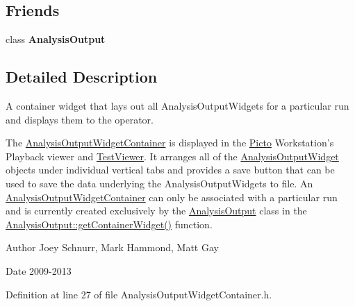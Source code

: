 \subsection*{Friends}
\begin{DoxyCompactItemize}
\item 
\hypertarget{class_picto_1_1_analysis_output_widget_container_a391f8d3311de188e51bf17af4eaa065a}{class {\bfseries Analysis\-Output}}\label{class_picto_1_1_analysis_output_widget_container_a391f8d3311de188e51bf17af4eaa065a}

\end{DoxyCompactItemize}


\subsection{Detailed Description}
A container widget that lays out all Analysis\-Output\-Widgets for a particular run and displays them to the operator. 

The \hyperlink{class_picto_1_1_analysis_output_widget_container}{Analysis\-Output\-Widget\-Container} is displayed in the \hyperlink{namespace_picto}{Picto} Workstation's Playback viewer and \hyperlink{class_test_viewer}{Test\-Viewer}. It arranges all of the \hyperlink{class_picto_1_1_analysis_output_widget}{Analysis\-Output\-Widget} objects under individual vertical tabs and provides a save button that can be used to save the data underlying the Analysis\-Output\-Widgets to file. An \hyperlink{class_picto_1_1_analysis_output_widget_container}{Analysis\-Output\-Widget\-Container} can only be associated with a particular run and is currently created exclusively by the \hyperlink{class_picto_1_1_analysis_output}{Analysis\-Output} class in the \hyperlink{class_picto_1_1_analysis_output_a8598720d301be74ad5639e2d08140c3c}{Analysis\-Output\-::get\-Container\-Widget()} function. \begin{DoxyAuthor}{Author}
Joey Schnurr, Mark Hammond, Matt Gay 
\end{DoxyAuthor}
\begin{DoxyDate}{Date}
2009-\/2013 
\end{DoxyDate}


Definition at line 27 of file Analysis\-Output\-Widget\-Container.\-h.




